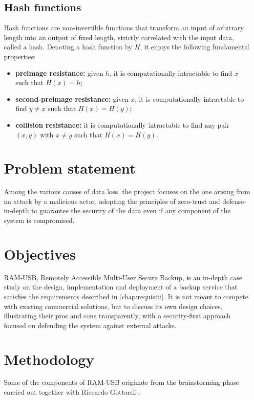 \subsection{Hash functions}

Hash functions are non-invertible functions that transform an input of arbitrary
length into an output of fixed length, strictly correlated with the input data, called a hash.
Denoting a hash function by $H$, it enjoys the following fundamental properties:

\begin{itemize}
    \item \textbf{preimage resistance:} given $h$, it is computationally intractable to find $x$
    such that $H(x) = h$;
    \item \textbf{second-preimage resistance:} given $x$, it is computationally intractable to
    find $y \neq x$ such that $H(x) = H(y)$;
    \item \textbf{collision resistance:} it is computationally intractable to find any pair
    $(x, y)$ with $x \neq y$ such that $H(x) = H(y)$.
\end{itemize}


\section{Problem statement}

Among the various causes of data loss, the project focuses on the one arising from an attack by a
malicious actor, adopting the principles of zero-trust and defense-in-depth to guarantee the
security of the data even if any component of the system is compromised.

\section{Objectives}

RAM-USB, Remotely Accessible Multi-User Secure Backup, is an in-depth case study on the design,
implementation and deployment of a backup service that satisfies the requirements
described in \autoref{chap:requisiti}. It is not meant to compete with existing commercial
solutions, but to discuss its own design choices, illustrating their pros and cons
transparently, with a security-first approach focused on defending the system against external attacks.


\section{Methodology}
Some of the components of RAM-USB originate from the brainstorming phase carried out together with Riccardo
Gottardi \cite{gottardi-github}.

